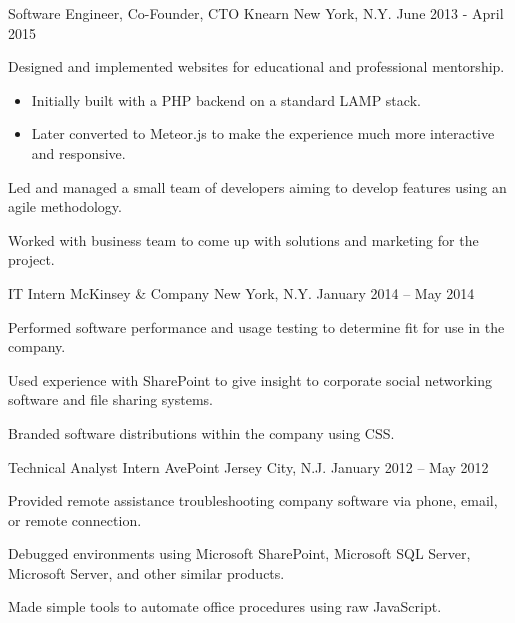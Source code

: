 \begin{cventries}
	\cventry
		{Software Engineer, Co-Founder, CTO} %
		{Knearn} %
		{New York, N.Y.} %
		{June 2013 - April 2015} %
		{
			\begin{cvitems} %
				\item {Designed and implemented websites for educational and professional mentorship.}
				\begin{itemize}
					\item {Initially built with a PHP backend on a standard LAMP stack.}
					\item {Later converted to Meteor.js to make the experience much more interactive and responsive.}
				\end{itemize}
				\item {Led and managed a small team of developers aiming to develop features using an agile methodology.}
				\item {Worked with business team to come up with solutions and marketing for the project.}
			\end{cvitems}
		}

	\cventry
		{IT Intern} %
		{McKinsey \& Company} %
		{New York, N.Y.} %
		{January 2014 – May 2014} %
		{
			\begin{cvitems} %
				\item {Performed software performance and usage testing to determine fit for use in the company.}
				\item {Used experience with SharePoint to give insight to corporate social networking software and file sharing systems.}
				\item {Branded software distributions within the company using CSS.}
			\end{cvitems}
		}

	\cventry
		{Technical Analyst Intern} %
		{AvePoint} %
		{Jersey City, N.J.} %
		{January 2012 – May 2012} %
		{
			\begin{cvitems} %
				\item {Provided remote assistance troubleshooting company software via phone, email, or remote connection.}
				\item {Debugged environments using Microsoft SharePoint, Microsoft SQL Server, Microsoft Server, and other similar products.}
				\item {Made simple tools to automate office procedures using raw JavaScript.}
			\end{cvitems}
		}


\end{cventries}
